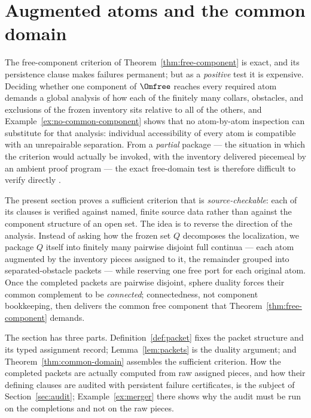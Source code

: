 
\section{Augmented atoms and the common domain}\label{sec:packets}

The free-component criterion of Theorem~\ref{thm:free-component} is exact, and its
persistence clause makes failures permanent; but as a \emph{positive} test it is
expensive. Deciding whether one component of $\Omfree$ reaches every required atom
demands a global analysis of how each of the finitely many collars, obstacles, and
exclusions of the frozen inventory sits relative to all of the others, and
Example~\ref{ex:no-common-component} shows that no atom-by-atom inspection can
substitute for that analysis: individual accessibility of every atom is compatible
with an unrepairable separation. From a \emph{partial} package --- the situation in
which the criterion would actually be invoked, with the inventory delivered piecemeal
by an ambient proof program --- the exact free-domain test is therefore difficult to
verify directly \cite{MWman}.

The present section proves a sufficient criterion that is \emph{source-checkable}:
each of its clauses is verified against named, finite source data rather than against
the component structure of an open set. The idea is to reverse the direction of the
analysis. Instead of asking how the frozen set $Q$ decomposes the localization, we
package $Q$ itself into finitely many pairwise disjoint full continua --- each atom
augmented by the inventory pieces assigned to it, the remainder grouped into
separated-obstacle packets --- while reserving one free port for each original atom.
Once the completed packets are pairwise disjoint, sphere duality forces their common
complement to be \emph{connected}; connectedness, not component bookkeeping, then
delivers the common free component that Theorem~\ref{thm:free-component} demands.

The section has three parts. Definition~\ref{def:packet} fixes the packet structure
and its typed assignment record; Lemma~\ref{lem:packets} is the duality argument; and
Theorem~\ref{thm:common-domain} assembles the sufficient criterion. How the completed
packets are actually computed from raw assigned pieces, and how their defining clauses
are audited with persistent failure certificates, is the subject of
Section~\ref{sec:audit}; Example~\ref{ex:merger} there shows why the audit must be run
on the completions and not on the raw pieces.

